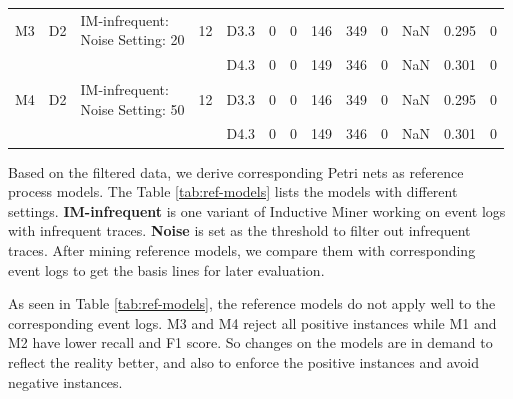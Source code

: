 \begin{table}[htp]
{\begin{tabular}{|llll|lllllllll|}
		M3                                                                      & D2                                                                        & \makecell[l]{IM-infrequent: \\ Noise Setting: 20} & 12                                                                         &D3.3 &  0  & 0   & 146   & 349   & 0       &NaN           &    0.295      & 0   \\
		
		&                                                                      & &                                                                          & D4.3 &  0  & 0   & 149   & 346   & 0       & NaN           &  0.301        &0    \\
		\hline 
		
		M4                                                                      & D2                                                                        & \makecell[l]{IM-infrequent: \\ Noise Setting: 50} & 12                                                                         &D3.3 &  0  &  0  &  146  & 349   & 0       & NaN           &     0.295     & 0\\   
		&                                                                      & &                                                                          & D4.3 &  0  & 0   & 149   & 346   & 0       & NaN           &  0.301        &0    \\
		
		\hline
	\end{tabular}
 }
\end{table}
Based on the filtered data, we derive corresponding Petri nets as reference process models. The Table \ref{tab:ref-models} lists the models with different settings. \textbf{IM-infrequent} is one variant of Inductive Miner working on event logs with infrequent traces. \textbf{Noise} is set as the threshold to filter out infrequent traces. After mining reference models, we compare them with  corresponding event logs to get the basis lines for later evaluation.

As seen in Table \ref{tab:ref-models}, the reference models do not apply well to the corresponding event logs. M3 and M4 reject all positive instances while M1 and M2 have lower recall and F1 score.   So changes on the models are in demand to reflect the reality better, and also to enforce the positive instances and avoid negative instances. 
